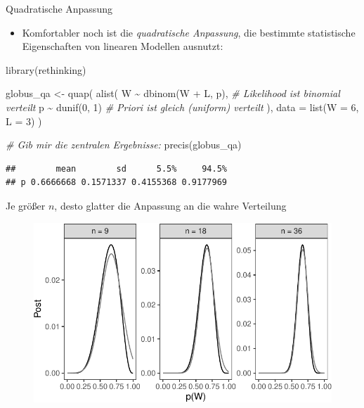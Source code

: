 \documentclass[
  ngerman,
  ignorenonframetext,
]{beamer}
\newenvironment{Shaded}{\begin{snugshade}}{\end{snugshade}}
\newcommand{\AttributeTok}[1]{\textcolor[rgb]{0.77,0.63,0.00}{#1}}
\newcommand{\CommentTok}[1]{\textcolor[rgb]{0.56,0.35,0.01}{\textit{#1}}}
\newcommand{\DecValTok}[1]{\textcolor[rgb]{0.00,0.00,0.81}{#1}}
\newcommand{\FunctionTok}[1]{\textcolor[rgb]{0.00,0.00,0.00}{#1}}
\newcommand{\NormalTok}[1]{#1}
\newcommand{\OtherTok}[1]{\textcolor[rgb]{0.56,0.35,0.01}{#1}}
\newcommand{\SpecialCharTok}[1]{\textcolor[rgb]{0.00,0.00,0.00}{#1}}
\providecommand{\tightlist}{%
  \setlength{\itemsep}{0pt}\setlength{\parskip}{0pt}}
\begin{document}
\begin{frame}[fragile]{Quadratische Anpassung}
\protect\hypertarget{quadratische-anpassung}{}
\begin{itemize}
\tightlist
\item
  Komfortabler noch ist die \emph{quadratische Anpassung}, die bestimmte
  statistische Eigenschaften von linearen Modellen ausnutzt:
\end{itemize}

\tiny

\begin{Shaded}
\begin{Highlighting}[]
\FunctionTok{library}\NormalTok{(rethinking)}

\NormalTok{globus\_qa }\OtherTok{\textless{}{-}} \FunctionTok{quap}\NormalTok{(}
  \FunctionTok{alist}\NormalTok{(}
\NormalTok{    W }\SpecialCharTok{\textasciitilde{}} \FunctionTok{dbinom}\NormalTok{(W }\SpecialCharTok{+}\NormalTok{ L, p),  }\CommentTok{\# Likelihood ist binomial verteilt}
\NormalTok{    p }\SpecialCharTok{\textasciitilde{}} \FunctionTok{dunif}\NormalTok{(}\DecValTok{0}\NormalTok{, }\DecValTok{1}\NormalTok{)        }\CommentTok{\# Priori ist gleich (uniform) verteilt}
\NormalTok{  ), }
  \AttributeTok{data =} \FunctionTok{list}\NormalTok{(}\AttributeTok{W =} \DecValTok{6}\NormalTok{, }\AttributeTok{L =} \DecValTok{3}\NormalTok{)}
\NormalTok{)}

\CommentTok{\# Gib mir die zentralen Ergebnisse:}
\FunctionTok{precis}\NormalTok{(globus\_qa)}
\end{Highlighting}
\end{Shaded}

\begin{verbatim}
##        mean        sd      5.5%     94.5%
## p 0.6666668 0.1571337 0.4155368 0.9177969
\end{verbatim}

\normalsize
\end{frame}

\begin{frame}{Je größer \(n\), desto glatter die Anpassung an die wahre
Verteilung}
\protect\hypertarget{je-gruxf6uxdfer-n-desto-glatter-die-anpassung-an-die-wahre-verteilung}{}
\begin{figure}[H]
\includegraphics[width=1\linewidth]{unnamed-chunk-28-1} \end{figure}
\end{frame}
\end{document}
